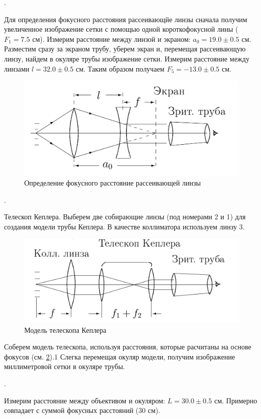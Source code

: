 \documentclass[a4paper, 12pt]{article}
\newcounter{Points}
\newcommand{\point}{\arabic{Points}. \addtocounter{Points}{1}}
\begin{document}
\point Для определения фокусного расстояния рассеивающйе линзы сначала получим увеличенное изображение сетки с помощью одной короткофокусной лины ($F_1 = 7.5$ см). Измерим расстояние между линзой и экраном: $a_0 = 19.0 \pm 0.5$ см. Разместим сразу за экраном трубу, уберем экран и, перемещая рассеивающую линзу, найдем в окуляре трубы изображение сетки. Измерим расстояние между линзами $l = 32.0 \pm 0.5$ см. Таким образом получаем $F_5 = -13.0 \pm 0.5$ см.

\begin{figure}[!h]
	\centering
	\includegraphics[scale = 0.4]{412-2.png}
	\caption{Определение фокусного расстояние рассеивающей линзы}
	\label{pic2}
\end{figure}

\point Телескоп Кеплера. Выберем две собирающие линзы (под номерами 2 и 1) для создания модели трубы Кеплера. В качестве коллиматора используем линзу 3.

\begin{figure}[!h]
	\centering
	\includegraphics[scale = 0.5]{412-3.png}
	\caption{Модель телескопа Кеплера}
	\label{pic3}
\end{figure}

Соберем модель телескопа, используя расстояния, которые расчитаны на основе фокусов (см. \ref{pic3}).1  Слегка перемещая окуляр модели, получим изображение миллиметровой сетки в окуляре трубы.

\point Измерим расстояние между объективом и окуляром: $L = 30.0 \pm 0.5$ см. Примерно совпадает с суммой фокусных расстояний ($30$ см).
\end{document}
